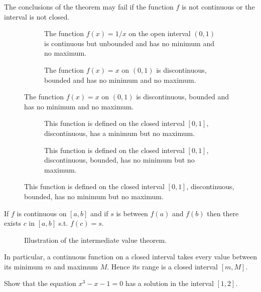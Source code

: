 \documentclass[../main.tex]{subfiles}
\begin{document}
\begin{example}
	The conclusions of the theorem may fail if the function $f$ is not continuous or the interval is not closed.

	\begin{figure}[H]
		\centering
		\begin{subfigure}[t]{0.4\textwidth}
			
			\caption{The function $f(x) = 1/x$ on the open interval $(0,1)$ is continuous but unbounded and has no minimum and no maximum.}
		\end{subfigure}
		\quad
		\begin{subfigure}[t]{0.4\textwidth}
			
			\caption{The function $f(x) = x$ on $(0,1)$ is discontinuous, bounded and has no minimum and no maximum.}
		\end{subfigure}
	\end{figure}

	\begin{figure}[H]
		\centering
		\begin{subfigure}[t]{0.4\textwidth}
			
			\caption{This function is defined on the closed interval $[0,1]$, discontinuous, has a minimum but no maximum.}
		\end{subfigure}
		\quad
		\begin{subfigure}[t]{0.4\textwidth}
			
			\caption{This function is defined on the closed interval $[0,1]$, discontinuous, bounded, has no minimum but no maximum.}
		\end{subfigure}
	\end{figure}
\end{example}

\begin{theorem}
	If $f$ is continuous on $[a, b]$ and if $s$ is between $f(a)$ and $f(b)$ then there exists $c$ in $[a, b]$ s.t. $f(c) = s$.
\end{theorem}

\begin{figure}[H]
	\centering
	
	\caption{Illustration of the intermediate value theorem.}
\end{figure}

In particular, a continuous function on a closed interval takes every value between its minimum $m$ and maximum $M$. Hence its range is a closed interval $[m, M]$.
\begin{example}
	Show that the equation $x^3 - x - 1 = 0$ has a solution in the interval $[1, 2]$.
\end{example}
\end{document}
